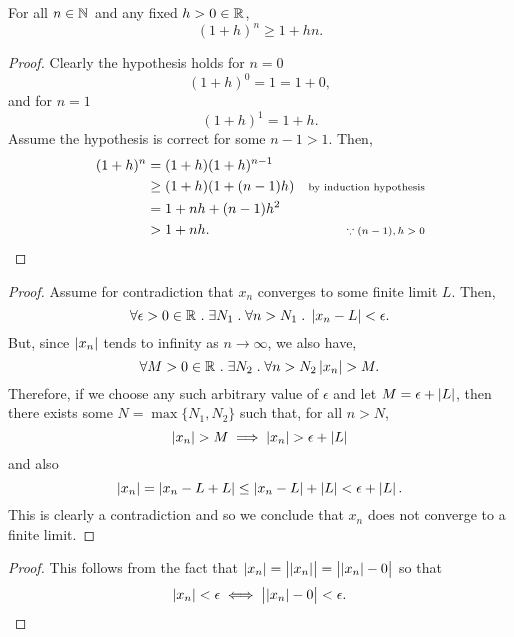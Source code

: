 \documentclass[../MathsNotesBase.tex]{subfiles}
\begin{document}
{	
		
		
		
		\nl[20]
		\begin{lemma}\label{lem:one-plus-h-to-the-power-n-is-geq-one-plus-hn}
			For all ${ n \in \mathbb{N}^{} }$ and any fixed ${ h > 0 \in \mathbb{R}^{} }$,
			\[ (1 + h)^n \geq 1 + hn. \]
		\end{lemma}
		\begin{proof}
			Clearly the hypothesis holds for ${ n = 0 }$
			\[ (1 + h)^0 = 1 = 1 + 0, \]
			and for ${ n = 1 }$
			\[ (1 + h)^1 = 1 + h. \]
			Assume the hypothesis is correct for some ${ n-1 > 1 }$. Then,
			\[\begin{aligned}
				(1 + h)^n &= (1 + h)(1 + h)^{n-1} \\
				&\geq (1 + h)(1 + (n-1)h) &\text{\scriptsize{by induction hypothesis}} \\
				&= 1 + nh + (n-1)h^2 \\
				&> 1 + nh.  &\text{\scriptsize{${ \because (n-1),h > 0 }$}}
			\end{aligned}\]	
		\end{proof}
	
		\bigskip
		\begin{proof}
			Assume for contradiction that $x_n$ converges to some finite limit $L$. Then,
			\[ \forall \epsilon > 0 \in \mathbb{R}^{} \;.\; \exists N_1 \;.\; \forall n > N_1 \;.\; \left\lvert x_n - L\right\rvert < \epsilon. \]
			But, since $\left\lvert x_n\right\rvert$ tends to infinity as ${ n \to \infty }$, we also have,
			\[ \forall M > 0 \in \mathbb{R}^{} \;.\; \exists N_2 \;.\; \forall n > N_2 \left\lvert x_n\right\rvert > M. \]
			Therefore, if we choose any such arbitrary value of $\epsilon$ and let ${ M = \epsilon + \left\lvert L\right\rvert }$, then there exists some ${ N = \max \{N_1,N_2\} }$ such that, for all ${ n > N }$,
			\[ \left\lvert x_n\right\rvert > M \implies \left\lvert x_n\right\rvert > \epsilon + \left\lvert L\right\rvert \]
			and also
			\[ \left\lvert x_n\right\rvert = \left\lvert x_n - L + L\right\rvert \leq \left\lvert x_n - L\right\rvert + \left\lvert L\right\rvert < \epsilon + \left\lvert L\right\rvert. \]
			This is clearly a contradiction and so we conclude that $x_n$ does not converge to a finite limit.
		\end{proof}
	
		\bigskip
		\begin{proof}
			This follows from the fact that ${ \left\lvert x_n\right\rvert = \left\lvert\left\lvert x_n\right\rvert\right\rvert = \left\lvert\left\lvert x_n\right\rvert - 0\right\rvert }$ so that
			\[ \left\lvert x_n\right\rvert < \epsilon \iff \left\lvert\left\lvert x_n\right\rvert - 0\right\rvert < \epsilon. \]
		\end{proof}
	
}
\end{document}
